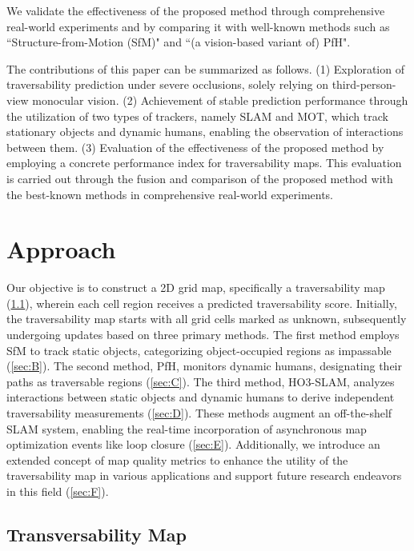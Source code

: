 \documentclass[letterpaper, 10 pt, conference]{ieeeconf}
\begin{document}
We validate the effectiveness of the proposed method through comprehensive real-world experiments and by comparing it with well-known methods such as ``Structure-from-Motion (SfM)"\cite{r17} and ``(a vision-based variant of) PfH"\cite{r16}.

The contributions of this paper can be summarized as follows. (1) Exploration of traversability prediction under severe occlusions, solely relying on third-person-view monocular vision. (2) Achievement of stable prediction performance through the utilization of two types of trackers, namely SLAM and MOT, which track stationary objects and dynamic humans, enabling the observation of interactions between them. (3) Evaluation of the effectiveness of the proposed method by employing a concrete performance index for traversability maps. This evaluation is carried out through the fusion and comparison of the proposed method with the best-known methods in comprehensive real-world experiments.

\figB



\section{Approach}\label{sec:A}

Our objective is to construct a 2D grid map, specifically a traversability map (\ref{sec:A}), wherein each cell region receives a predicted traversability score. Initially, the traversability map starts with all grid cells marked as unknown, subsequently undergoing updates based on three primary methods. The first method employs SfM to track static objects, categorizing object-occupied regions as impassable (\ref{sec:B}). The second method, PfH, monitors dynamic humans, designating their paths as traversable regions (\ref{sec:C}). The third method, HO3-SLAM, analyzes interactions between static objects and dynamic humans to derive independent traversability measurements (\ref{sec:D}). These methods augment an off-the-shelf SLAM system, enabling the real-time incorporation of asynchronous map optimization events like loop closure (\ref{sec:E}). Additionally, we introduce an extended concept of map quality metrics to enhance the utility of the traversability map in various applications and support future research endeavors in this field (\ref{sec:F}).


\subsection{Transversability Map}\label{sec:A}
\end{document}
